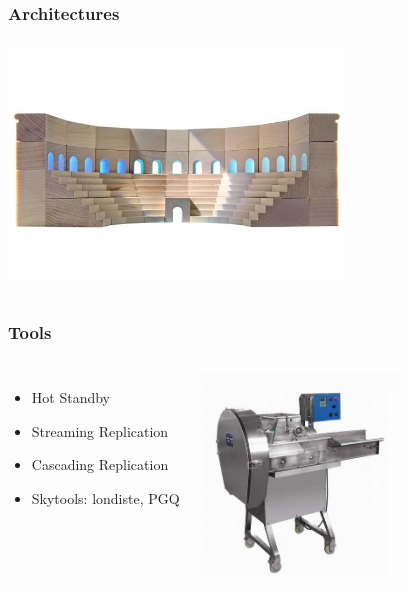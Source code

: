 \documentclass{beamer}
\begin{document}
\begin{frame}
  \frametitle{Architectures}


\begin{columns}[c]
  \includegraphics[height=16em]{building-blocks.jpg}
\end{columns}
\end{frame}

\begin{frame}
  \frametitle{Tools}


\begin{columns}[c]

  \begin{itemize}
    \item Hot Standby
    \item Streaming Replication
    \item Cascading Replication
    \item Skytools: londiste, PGQ
  \end{itemize}  

\includegraphics[height=15em]{multi_function_equipment.jpg}
\end{columns}
\end{frame}
\end{document}
